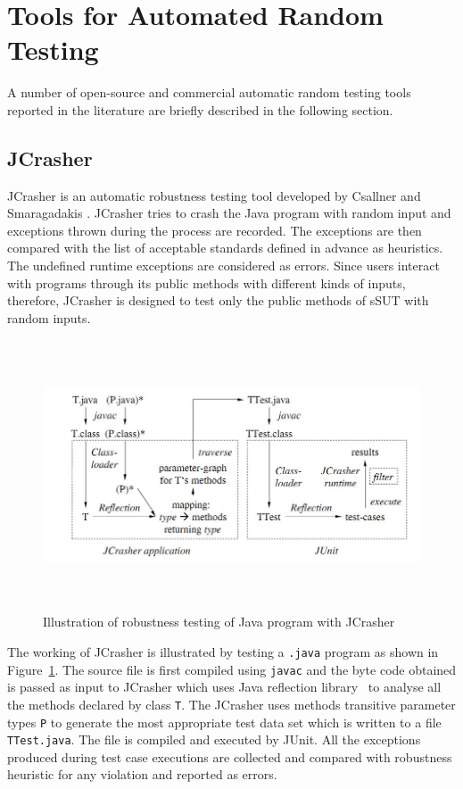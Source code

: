 \section{Tools for Automated Random Testing}
A number of open-source and commercial automatic random testing tools reported in the literature are briefly described in the following section.


\subsection{JCrasher}
JCrasher is an automatic robustness testing tool developed by Csallner and Smaragadakis \cite{csallner2004jcrasher}. JCrasher tries to crash the Java program with random input and exceptions thrown during the process are recorded. The exceptions are then compared with the list of acceptable standards defined in advance as heuristics. The undefined runtime exceptions are considered as errors. Since users interact with programs through its public methods with different kinds of inputs, therefore, JCrasher is designed to test only the public methods of sSUT with random inputs.

\begin{figure}[h]
	\centering
	\includegraphics[width=15cm, height=8cm]{chapter2/JCrasher.png}
	\caption{Illustration of robustness testing of Java program with JCrasher~\cite{csallner2004jcrasher}}
	\label{fig:JCrasher}
\end{figure}

The working of JCrasher is illustrated by testing a \verb+.java+ program as shown in Figure~\ref{fig:JCrasher}. The source file is first compiled using \verb+javac+ and the byte code obtained is passed as input to JCrasher which uses Java reflection library~\cite{chan1999java} to analyse all the methods declared by class \verb+T+. The JCrasher uses methods transitive parameter types \verb+P+ to generate the most appropriate test data set which is written to a file \verb+TTest.java+. The file is compiled and executed by JUnit. All the exceptions produced during test case executions are collected and compared with robustness heuristic for any violation and reported as errors.

